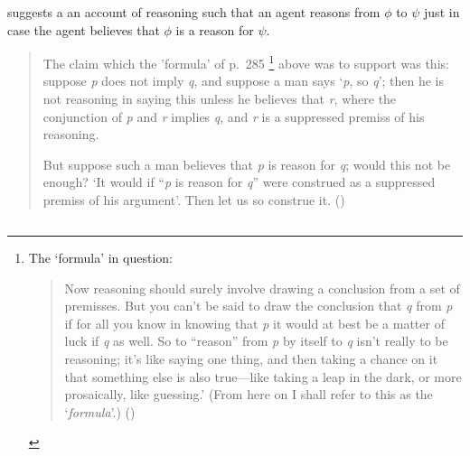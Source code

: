 \begin{note}
  \citeauthor{Thomson:1965vv} suggests a an account of reasoning such that an agent reasons from \(\phi\) to \(\psi\) just in case the agent believes that \(\phi\) is a reason for \(\psi\).
  \begin{quote}
    The claim which the 'formula' of p.\ 285\nolinebreak
    \footnote{
      The `formula' in question:
      \begin{quote}
        Now reasoning should surely involve drawing a conclusion from a set of premisses.
        But you can't be said to draw the conclusion that \emph{q} from \emph{p} if for all you know in knowing that \emph{p} it would at best be a matter of luck if \emph{q} as well.
        So to ``reason'' from \emph{p} by itself to \emph{q} isn't really to be reasoning; it's like saying one thing, and then taking a chance on it that something else is also true---like taking a leap in the dark, or more prosaically, like guessing.'
        (From here on I shall refer to this as the `\emph{formula}'.)\nolinebreak
        \mbox{}\hfill\mbox{(\citeyear[285]{Thomson:1965vv})}
      \end{quote}
    }
    above was to support was this:
    suppose \emph{p} does not imply \emph{q}, and suppose a man says `\emph{p}, so \emph{q}';
    then he is not reasoning in saying this unless he believes that \emph{r}, where the conjunction of \emph{p} and \emph{r} implies \emph{q}, and \emph{r} is a suppressed premiss of his reasoning.\par
    But suppose such a man believes that \emph{p} is reason for \emph{q}; would this not be enough?
    `It would if ``\emph{p} is reason for \emph{q}'' were construed as a suppressed premiss of his argument'.
    Then let us so construe it.%
    \mbox{}\hfill\mbox{(\citeyear[294]{Thomson:1965vv})}
  \end{quote}
\end{note}

\subsection*{\textcite{Longino:1978wv}}

